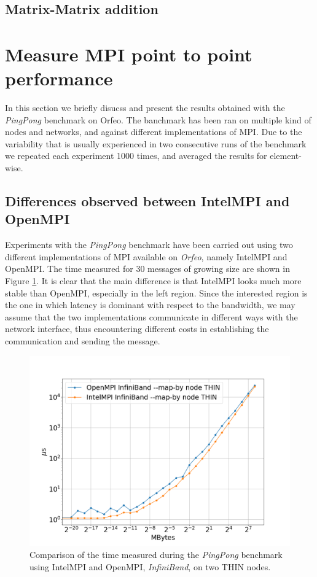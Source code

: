 \documentclass{article}
\begin{document}
\subsection{Matrix-Matrix addition}

\section{Measure MPI point to point performance}
In this section we briefly disucss and present the results obtained with the \emph{PingPong} benchmark on Orfeo. The banchmark has been ran on multiple kind of nodes and networks, and against different implementations of MPI. Due to the variability that is usually experienced in two consecutive runs of the benchmark we repeated each experiment 1000 times, and averaged the results for element-wise.

\subsection{Differences observed between IntelMPI and OpenMPI}
Experiments with the \emph{PingPong} benchmark have been carried out using two different implementations of MPI available on \emph{Orfeo}, namely IntelMPI and OpenMPI. The time measured for 30 messages of growing size are shown in Figure \ref{fig:ompi_vs_intel}. It is clear that the main difference is that IntelMPI looks much more stable than OpenMPI, especially in the left region. Since the interested region is the one in which latency is dominant with respect to the bandwidth, we may assume that the two implementations communicate in different ways with the network interface, thus encountering different costs in establishing the communication and sending the message.

\begin{figure}[t]
    \centering
    \includegraphics[width=\textwidth]{benchmark/intel_vs_ompi_node.png}
    \caption{Comparison of the time measured during the \emph{PingPong} benchmark using IntelMPI and OpenMPI, \emph{InfiniBand}, on two THIN nodes.}
    \label{fig:ompi_vs_intel}
\end{figure}
\end{document}
